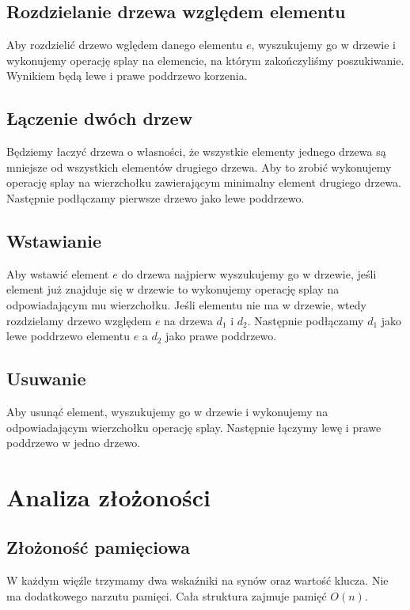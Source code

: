 \documentclass[declaration,shortabstract]{iithesis}
\theoremstyle{remark}
\theoremstyle{plain}
\theoremstyle{plain}
\theoremstyle{plain}
\begin{document}
\subsection{Rozdzielanie drzewa względem elementu}
Aby rozdzielić drzewo wględem danego elementu \(e\), wyszukujemy go w drzewie i wykonujemy operację splay na elemencie, na którym zakończyliśmy poszukiwanie. Wynikiem będą lewe i prawe poddrzewo korzenia. 

\subsection{Łączenie dwóch drzew}
Będziemy łaczyć drzewa o własności, że wszystkie elementy jednego drzewa są mniejsze od wszystkich elementów drugiego drzewa. Aby to zrobić wykonujemy operację splay na wierzchołku zawierającym minimalny element drugiego drzewa. Następnie podłączamy pierwsze drzewo jako lewe poddrzewo. 

\subsection{Wstawianie}
Aby wstawić element \(e\) do drzewa najpierw wyszukujemy go w drzewie, jeśli element już znajduje się w drzewie to wykonujemy operację splay na odpowiadającym mu wierzchołku. Jeśli elementu nie ma w drzewie, wtedy rozdzielamy drzewo względem \(e\) na drzewa \(d_1\) i \( d_2\). Następnie podłączamy \(d_1\) jako lewe poddrzewo elementu  \(e\) a \(d_2\) jako prawe poddrzewo. 

\subsection{Usuwanie}
Aby usunąć element, wyszukujemy go w drzewie i wykonujemy na odpowiadającym wierzchołku operację splay. Następnie łączymy lewę i prawe poddrzewo w jedno drzewo. 

\section{Analiza złożoności}

\subsection{Złożoność pamięciowa}
W każdym więźle trzymamy dwa wskaźniki na synów oraz wartość klucza. Nie ma dodatkowego narzutu pamięci. Cała struktura zajmuje pamięć $ O(n)$.
\end{document}

